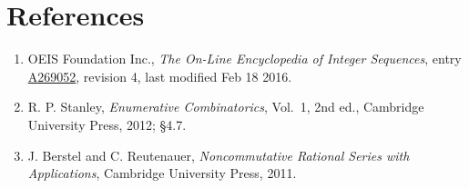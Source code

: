 \documentclass[11pt]{article}
\theoremstyle{definition}
\begin{document}
\section{References}

\begin{enumerate}

\item OEIS Foundation Inc., \emph{The On-Line Encyclopedia of Integer Sequences}, entry \href{https://oeis.org/A269052}{A269052}, revision 4, last modified Feb 18 2016.

\item R. P. Stanley, \emph{Enumerative Combinatorics}, Vol.~1, 2nd ed., Cambridge University Press, 2012; \S4.7.

\item J. Berstel and C. Reutenauer, \emph{Noncommutative Rational Series with Applications}, Cambridge University Press, 2011.

\end{enumerate}
\end{document}
